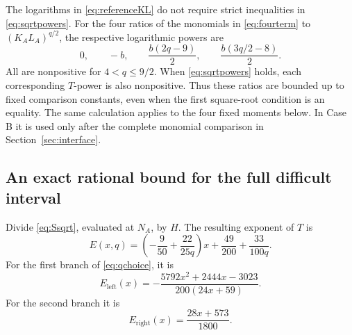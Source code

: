 \documentclass[11pt,reqno]{amsart}
\numberwithin{equation}{section}
\theoremstyle{definition}
\theoremstyle{remark}
\newcommand{\blocklog}{b}
\begin{document}
The logarithms in \eqref{eq:referenceKL} do not require strict inequalities in \eqref{eq:sqrtpowers}.
For the four ratios of the monomials in \eqref{eq:fourterm} to $(K_AL_A)^{q/2}$, the respective logarithmic powers are
\begin{equation}\label{eq:logratios}
 0,\qquad-\blocklog,\qquad
 \frac{\blocklog(2q-9)}2,\qquad
 \frac{\blocklog(3q/2-8)}2.
\end{equation}
All are nonpositive for $4<q\le9/2$. When \eqref{eq:sqrtpowers} holds, each corresponding $T$-power is also nonpositive.
Thus these ratios are bounded up to fixed comparison constants, even when the first square-root condition is an equality. The same calculation applies to the four fixed moments below. In Case B it is used only after the complete monomial comparison in Section~\ref{sec:interface}.

\subsection{An exact rational bound for the full difficult interval}
Divide \eqref{eq:Ssqrt}, evaluated at $N_A$, by $H$.
The resulting exponent of $T$ is
\begin{equation}\label{eq:E}
 E(x,q)=\left(-\frac9{50}+\frac{22}{25q}\right)x
       +\frac{49}{200}+\frac{33}{100q}.
\end{equation}
For the first branch of \eqref{eq:qchoice}, it is
\begin{equation}\label{eq:Eleft}
 E_{\mathrm{left}}(x)=
 -\frac{5792x^2+2444x-3023}{200(24x+59)}.
\end{equation}
For the second branch it is
\begin{equation}\label{eq:Eright}
 E_{\mathrm{right}}(x)=\frac{28x+573}{1800}.
\end{equation}
\end{document}
